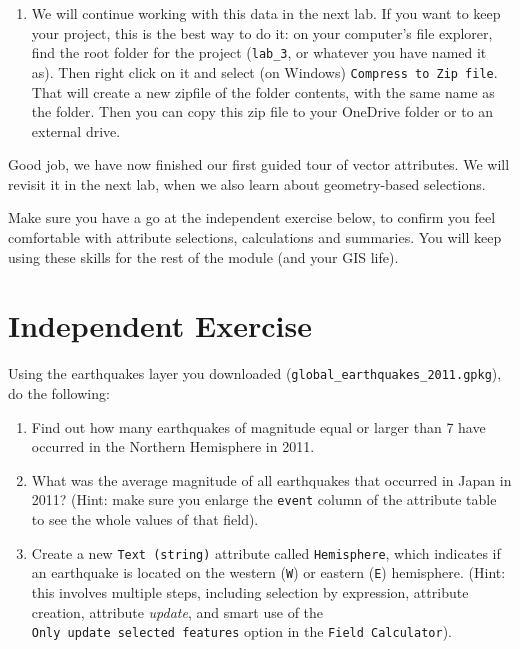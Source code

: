 \documentclass[
  letterpaper,
  DIV=11,
  numbers=noendperiod]{scrreprt}
\providecommand{\tightlist}{%
  \setlength{\itemsep}{0pt}\setlength{\parskip}{0pt}}\usepackage{longtable,booktabs,array}
\begin{document}
\begin{enumerate}
\def\labelenumi{(\arabic{enumi})}
\setcounter{enumi}{106}
\tightlist
\item
  We will continue working with this data in the next lab. If you want
  to keep your project, this is the best way to do it: on your
  computer's file explorer, find the root folder for the project
  (\texttt{lab\_3}, or whatever you have named it as). Then right click
  on it and select (on Windows) \texttt{Compress\ to\ Zip\ file}. That
  will create a new zipfile of the folder contents, with the same name
  as the folder. Then you can copy this zip file to your OneDrive folder
  or to an external drive.
\end{enumerate}

Good job, we have now finished our first guided tour of vector
attributes. We will revisit it in the next lab, when we also learn about
geometry-based selections.

Make sure you have a go at the independent exercise below, to confirm
you feel comfortable with attribute selections, calculations and
summaries. You will keep using these skills for the rest of the module
(and your GIS life).

\section{Independent Exercise}\label{independent-exercise}

Using the earthquakes layer you downloaded
(\texttt{global\_earthquakes\_2011.gpkg}), do the following:

\begin{enumerate}
\def\labelenumi{\arabic{enumi})}
\item
  Find out how many earthquakes of magnitude equal or larger than 7 have
  occurred in the Northern Hemisphere in 2011.
\item
  What was the average magnitude of all earthquakes that occurred in
  Japan in 2011? (Hint: make sure you enlarge the \texttt{event} column
  of the attribute table to see the whole values of that field).
\item
  Create a new \texttt{Text\ (string)} attribute called
  \texttt{Hemisphere}, which indicates if an earthquake is located on
  the western (\texttt{W}) or eastern (\texttt{E}) hemisphere. (Hint:
  this involves multiple steps, including selection by expression,
  attribute creation, attribute \emph{update}, and smart use of the
  \texttt{Only\ update\ selected\ features} option in the
  \texttt{Field\ Calculator}).
\end{enumerate}
\end{document}
